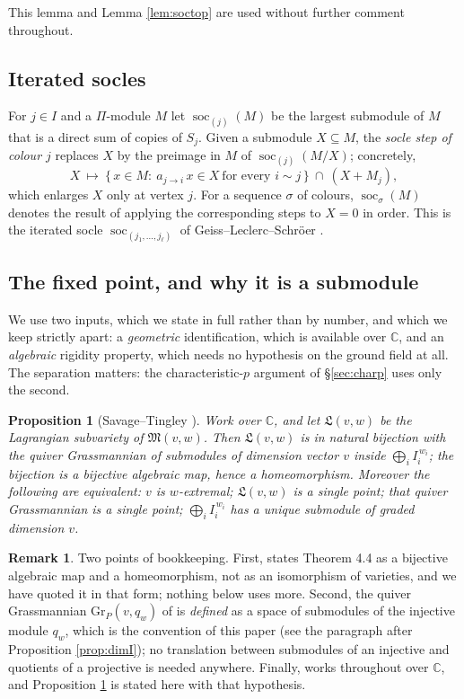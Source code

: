 \documentclass[reqno]{amsart}
\theoremstyle{plain}
\newtheorem{proposition}[theorem]{Proposition}
\theoremstyle{definition}
\newtheorem{remark}[theorem]{Remark}
\DeclareMathOperator{\soc}{soc}
\newcommand{\Pia}{\Pi}
\begin{document}
This lemma and Lemma \ref{lem:soctop} are used without further comment
throughout.

\subsection{Iterated socles}
For $j\in I$ and a $\Pia$-module $M$ let $\soc_{(j)}(M)$ be the largest
submodule of $M$ that is a direct sum of copies of $S_j$.  Given a submodule
$X\subseteq M$, the \emph{socle step of colour $j$} replaces $X$ by the
preimage in $M$ of $\soc_{(j)}(M/X)$; concretely,
\[
   X\ \longmapsto\ \{\,x\in M:\ a_{j\to i}\,x\in X\ \text{for every } i\sim j\,\}
   \ \cap\ (X+M_j),
\]
which enlarges $X$ only at vertex $j$.  For a sequence $\sigma$ of colours,
$\soc_\sigma(M)$ denotes the result of applying the corresponding steps to
$X=0$ in order.  This is the iterated socle
$\soc_{(j_1,\dots,j_\ell)}$ of Geiss--Leclerc--Schr\"oer \cite[\S2.4]{GLS}.

\subsection{The fixed point, and why it is a submodule}
We use two inputs, which we state in full rather than by number, and which we
keep strictly apart: a \emph{geometric} identification, which is available over
$\mathbb{C}$, and an \emph{algebraic} rigidity property, which needs no
hypothesis on the ground field at all.  The separation matters: the
characteristic-$p$ argument of \S\ref{sec:charp} uses only the second.

\begin{proposition}[Savage--Tingley {\cite[Thm.~4.4, Prop.~4.9]{ST}}]
\label{prop:ST}
Work over $\mathbb{C}$, and let $\mathfrak{L}(v,w)$ be the Lagrangian
subvariety of $\mathfrak{M}(v,w)$.  Then $\mathfrak{L}(v,w)$ is in natural
bijection with the quiver Grassmannian of submodules of dimension vector $v$
inside $\bigoplus_iI_i^{\,w_i}$; the bijection is a bijective algebraic map,
hence a homeomorphism.  Moreover the following are equivalent: $v$ is
$w$-extremal; $\mathfrak{L}(v,w)$ is a single point; that quiver Grassmannian
is a single point; $\bigoplus_iI_i^{\,w_i}$ has a unique submodule of graded
dimension $v$.
\end{proposition}

\begin{remark}\label{rem:STconv}
Two points of bookkeeping.  First, \cite{ST} states Theorem 4.4 as a bijective
algebraic map and a homeomorphism, not as an isomorphism of varieties, and we
have quoted it in that form; nothing below uses more.  Second, the quiver
Grassmannian $\mathrm{Gr}_P(v,q_w)$ of \cite{ST} is \emph{defined} as a space
of submodules of the injective module $q_w$, which is the convention of this
paper (see the paragraph after Proposition \ref{prop:dimI}); no translation
between submodules of an injective and quotients of a projective is needed
anywhere.
Finally, \cite{ST} works throughout over $\mathbb{C}$, and Proposition
\ref{prop:ST} is stated here with that hypothesis.
\end{remark}
\end{document}
